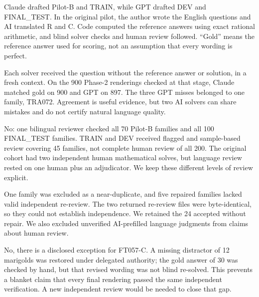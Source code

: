 Claude drafted Pilot-B and TRAIN, while GPT drafted DEV and FINAL\_TEST. In the original pilot, the author wrote the English questions and AI translated R and C. Code computed the reference answers using exact rational arithmetic, and blind solver checks and human review followed. “Gold” means the reference answer used for scoring, not an assumption that every wording is perfect.

\medskip{}\par\nopagebreak

Each solver received the question without the reference answer or solution, in a fresh context. On the 900 Phase-2 renderings checked at that stage, Claude matched gold on 900 and GPT on 897. The three GPT misses belonged to one family, TRA072. Agreement is useful evidence, but two AI solvers can share mistakes and do not certify natural language quality.

\medskip{}\par\nopagebreak

No: one bilingual reviewer checked all 70 Pilot-B families and all 100 FINAL\_TEST families. TRAIN and DEV received flagged and sample-based review covering 45 families, not complete human review of all 200. The original cohort had two independent human mathematical solves, but language review rested on one human plus an adjudicator. We keep these different levels of review explicit.

\medskip{}\par\nopagebreak

One family was excluded as a near-duplicate, and five repaired families lacked valid independent re-review. The two returned re-review files were byte-identical, so they could not establish independence. We retained the 24 accepted without repair. We also excluded unverified AI-prefilled language judgments from claims about human review.

\medskip{}\par\nopagebreak

No, there is a disclosed exception for FT057-C. A missing distractor of 12 marigolds was restored under delegated authority; the gold answer of 30 was checked by hand, but that revised wording was not blind re-solved. This prevents a blanket claim that every final rendering passed the same independent verification. A new independent review would be needed to close that gap.

